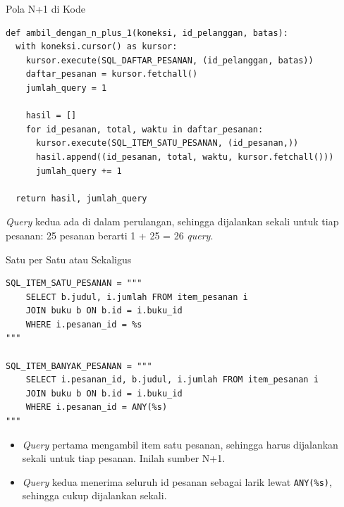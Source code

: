 \documentclass[aspectratio=169, table, 12pt]{beamer}
\begin{document}
\begin{frame}[fragile]{{\Large Pola N+1 di Kode}}
  \vspace{2pt}
\begin{lstlisting}[style=PythonStyle]
def ambil_dengan_n_plus_1(koneksi, id_pelanggan, batas):
  with koneksi.cursor() as kursor:
    kursor.execute(SQL_DAFTAR_PESANAN, (id_pelanggan, batas))
    daftar_pesanan = kursor.fetchall()
    jumlah_query = 1

    hasil = []
    for id_pesanan, total, waktu in daftar_pesanan:
      kursor.execute(SQL_ITEM_SATU_PESANAN, (id_pesanan,))
      hasil.append((id_pesanan, total, waktu, kursor.fetchall()))
      jumlah_query += 1

  return hasil, jumlah_query
\end{lstlisting}

  \vspace{2pt}
  {\footnotesize \textit{Query} kedua ada di dalam perulangan, sehingga dijalankan
  sekali untuk tiap pesanan: 25 pesanan berarti 1 + 25 = 26 \textit{query}.}
\end{frame}

\begin{frame}[fragile]{{\Large Satu per Satu atau Sekaligus}}
  \vspace{2pt}
\begin{lstlisting}[style=PythonStyle, basicstyle=\ttfamily\fontsize{7}{8.5}\selectfont]
SQL_ITEM_SATU_PESANAN = """
    SELECT b.judul, i.jumlah FROM item_pesanan i
    JOIN buku b ON b.id = i.buku_id
    WHERE i.pesanan_id = %s
"""

SQL_ITEM_BANYAK_PESANAN = """
    SELECT i.pesanan_id, b.judul, i.jumlah FROM item_pesanan i
    JOIN buku b ON b.id = i.buku_id
    WHERE i.pesanan_id = ANY(%s)
"""
\end{lstlisting}

  \vspace{2pt}
  {\footnotesize
  \begin{itemize}
    \item \textit{Query} pertama mengambil item satu pesanan, sehingga harus dijalankan
          sekali untuk tiap pesanan. Inilah sumber N+1.
    \item \textit{Query} kedua menerima seluruh id pesanan sebagai larik lewat
          \texttt{ANY(\%s)}, sehingga cukup dijalankan sekali.
  \end{itemize}}
\end{frame}
\end{document}
